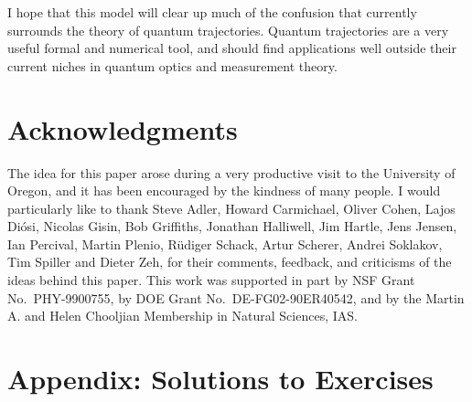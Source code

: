 I hope that this model will clear up much of the confusion that currently
surrounds the theory of quantum trajectories.  Quantum trajectories are
a very useful formal and numerical tool, and should find applications well
outside their current niches in quantum optics and measurement theory.

\section*{Acknowledgments}

The idea for this paper arose during a very productive visit to the University
of Oregon, and it has been encouraged by the kindness of many people.
I would particularly like to thank Steve Adler, Howard Carmichael,
Oliver Cohen, Lajos Di\'osi, Nicolas Gisin, Bob Griffiths, Jonathan Halliwell,
Jim Hartle, Jens Jensen, Ian Percival, Martin Plenio, R\"udiger Schack,
Artur Scherer, Andrei Soklakov, Tim Spiller and Dieter Zeh, for
their comments, feedback, and criticisms of the ideas behind this paper.
This work was supported in part by NSF Grant No.~PHY-9900755, by
DOE Grant No.~DE-FG02-90ER40542, and by the Martin A. and Helen Chooljian
Membership in Natural Sciences, IAS.

\section*{Appendix:  Solutions to Exercises}

